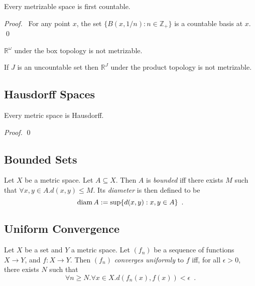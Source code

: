 \begin{prop}
Every metrizable space is first countable.
\end{prop}

\begin{proof}
\pf\ For any point $x$, the set $\{ B(x, 1/n) : n \in \mathbb{Z}_+ \}$ is a countable basis at $x$. \qed
\end{proof}

\begin{cor}
$\mathbb{R}^\omega$ under the box topology is not metrizable.
\end{cor}

\begin{cor}
If $J$ is an uncountable set then $\mathbb{R}^J$ under the product topology is not metrizable.
\end{cor}

\subsection{Hausdorff Spaces}

\begin{prop}
Every metric space is Hausdorff.
\end{prop}

\begin{proof}
\pf
{}
\qed
\end{proof}

\subsection{Bounded Sets}

\begin{df}[Bounded]
Let $X$ be a metric space. Let $A \subseteq X$. Then $A$ is \emph{bounded} iff there exists $M$ such that $\forall x,y \in A. d(x,y) \leq M$. Its \emph{diameter} is then defined to be
\[ \operatorname{diam} A := \sup \{ d(x,y) : x,y \in A \} \enspace . \]
\end{df}

\subsection{Uniform Convergence}

\begin{df}
Let $X$ be a set and $Y$ a metric space. Let $(f_n)$ be a sequence of functions $X \rightarrow Y$, and $f : X \rightarrow Y$. Then $(f_n)$ \emph{converges uniformly} to $f$ iff, for all $\epsilon > 0$, there exists $N$ such that
\[ \forall n \geq N. \forall x \in X. d(f_n(x),f(x)) < \epsilon \enspace . \]
\end{df}

